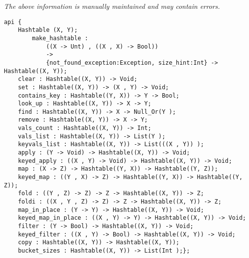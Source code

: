\label{api:Hashtable}

{\tiny \it The above information is manually maintained and may contain errors.}
\begin{verbatim}
api {
    Hashtable (X, Y);
        make_hashtable :
            ((X -> Unt) , ((X , X) -> Bool))
            ->
            {not_found_exception:Exception, size_hint:Int} -> Hashtable((X, Y));
    clear : Hashtable((X, Y)) -> Void;
    set : Hashtable((X, Y)) -> (X , Y) -> Void;
    contains_key : Hashtable((Y, X)) -> Y -> Bool;
    look_up : Hashtable((X, Y)) -> X -> Y;
    find : Hashtable((X, Y)) -> X -> Null_Or(Y );
    remove : Hashtable((X, Y)) -> X -> Y;
    vals_count : Hashtable((X, Y)) -> Int;
    vals_list : Hashtable((X, Y)) -> List(Y );
    keyvals_list : Hashtable((X, Y)) -> List(((X , Y)) );
    apply : (Y -> Void) -> Hashtable((X, Y)) -> Void;
    keyed_apply : ((X , Y) -> Void) -> Hashtable((X, Y)) -> Void;
    map : (X -> Z) -> Hashtable((Y, X)) -> Hashtable((Y, Z));
    keyed_map : ((Y , X) -> Z) -> Hashtable((Y, X)) -> Hashtable((Y, Z));
    fold : ((Y , Z) -> Z) -> Z -> Hashtable((X, Y)) -> Z;
    foldi : ((X , Y , Z) -> Z) -> Z -> Hashtable((X, Y)) -> Z;
    map_in_place : (Y -> Y) -> Hashtable((X, Y)) -> Void;
    keyed_map_in_place : ((X , Y) -> Y) -> Hashtable((X, Y)) -> Void;
    filter : (Y -> Bool) -> Hashtable((X, Y)) -> Void;
    keyed_filter : ((X , Y) -> Bool) -> Hashtable((X, Y)) -> Void;
    copy : Hashtable((X, Y)) -> Hashtable((X, Y));
    bucket_sizes : Hashtable((X, Y)) -> List(Int );};
\end{verbatim}
